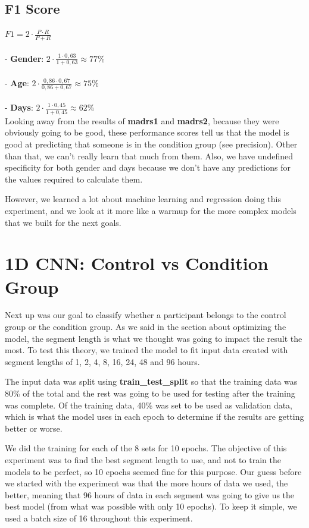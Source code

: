 \subsection{F1 Score}
$ F1 = 2 \cdot \frac{P \cdot R}{P + R} $
\\\\
- \textbf{Gender}: $2 \cdot \frac{1 \cdot 0,63}{1 + 0,63} \approx 77\%$\\\\
- \textbf{Age}: $2 \cdot \frac{0,86 \cdot 0,67}{0,86 + 0,67} \approx 75\%$\\\\
- \textbf{Days}: $2 \cdot \frac{1 \cdot 0,45}{1 + 0,45} \approx 62\%$\\

Looking away from the results of \textbf{madrs1} and \textbf{madrs2}, because they were obviously going to be good, these performance scores tell us that the model 
is good at predicting that someone is in the condition group (see precision). Other than that, we can't really learn that much from them. 
Also, we have undefined specificity for both gender and days because we don't have any predictions for the values required to calculate them. 

However, we learned a lot about machine learning and regression doing this experiment, and we look at it more like a warmup for the more complex models that we built 
for the next goals.

\section{1D CNN: Control vs Condition Group}

Next up was our goal to classify whether a participant belongs to the control group or the condition group. 
As we said in the section about optimizing the model, the segment length is what we thought was going to impact the result the most. 
To test this theory, we trained the model to fit input data created with segment lengths of 1, 2, 4, 8, 16, 24, 48 and 96 hours. 

The input data was split using \textbf{train\_test\_split} so that the training data was 80\% of the total and the rest was going to be used for 
testing after the training was complete. Of the training data, 40\% was set to be used as validation data, which is what the model uses in 
each epoch to determine if the results are getting better or worse. 

We did the training for each of the 8 sets for 10 epochs. The objective of this experiment was to find the best segment length to use, 
and not to train the models to be perfect, so 10 epochs seemed fine for this purpose. Our guess before we started with the experiment was 
that the more hours of data we used, the better, meaning that 96 hours of data in each segment was going to give us the best model 
(from what was possible with only 10 epochs). To keep it simple, we used a batch size of 16 throughout this experiment.

